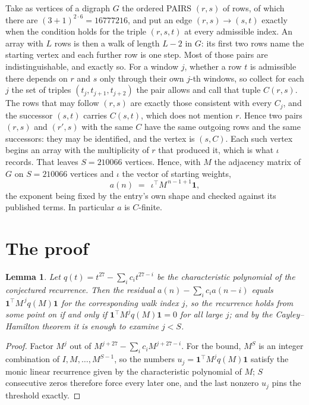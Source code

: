 \documentclass[11pt,a4paper]{article}
\theoremstyle{plain}
\newtheorem{lemma}[theorem]{Lemma}
\theoremstyle{definition}
\begin{document}
Take as vertices of a digraph $G$ the ordered PAIRS $(r,s)$ of rows, of which there are
$(3+1)^{2\cdot6}=16777216$, and put an edge $(r,s)\to(s,t)$ exactly when the condition
holds for the triple $(r,s,t)$ at every admissible index. An array with $L$ rows is then a
walk of length $L-2$ in $G$: its first two rows name the starting vertex and each further
row is one step. Most of those pairs are indistinguishable, and exactly so. For a window $j$, whether a row $t$ is admissible there depends on $r$ and $s$ only through their own $j$-th windows, so collect for each $j$ the set of triples $(t_j,t_{j+1},t_{j+2})$ the pair allows and call that tuple $C(r,s)$. The rows that may follow $(r,s)$ are exactly those consistent with every $C_j$, and the successor $(s,t)$ carries $C(s,t)$, which does not mention $r$. Hence two pairs $(r,s)$ and $(r',s)$ with the same $C$ have the same outgoing rows and the same successors: they may be identified, and the vertex is $(s,C)$. Each such vertex begins an array with the multiplicity of $r$ that produced it, which is what $\iota$ records. That leaves $S=210066$ vertices. Hence, with $M$ the adjacency matrix of $G$ on $S=210066$ vertices and
$\iota$ the vector of starting weights,
\[
a(n)\;=\;\,\iota^{\!\top}M^{\,n-1+1}\mathbf{1},
\]
the exponent being fixed by the entry's own shape and checked against its published terms.
In particular $a$ is $C$-finite.

\section{The proof}

\begin{lemma}\label{lem:crit}
Let $q(t)=t^{27}-\sum_i c_it^{27-i}$ be the characteristic polynomial of the
conjectured recurrence. Then the residual $a(n)-\sum_ic_ia(n-i)$ equals
$\mathbf{1}^{\!\top}M^{\,j}q(M)\mathbf{1}$ for the corresponding walk index
$j$, so the recurrence holds from some point on if and only if
$\mathbf{1}^{\!\top}M^{j}q(M)\mathbf{1}=0$ for all large $j$; and by the
Cayley--Hamilton theorem it is enough to examine $j<S$.
\end{lemma}

\begin{proof}
Factor $M^{j}$ out of $M^{j+27}-\sum_ic_iM^{j+27-i}$. For the bound, $M^{S}$
is an integer combination of $I,M,\dots,M^{S-1}$, so the numbers
$u_j=\mathbf{1}^{\!\top}M^{j}q(M)\mathbf{1}$ satisfy the monic linear recurrence given by
the characteristic polynomial of $M$; $S$ consecutive zeros therefore force every later one,
and the last nonzero $u_j$ pins the threshold exactly.
\end{proof}
\end{document}

